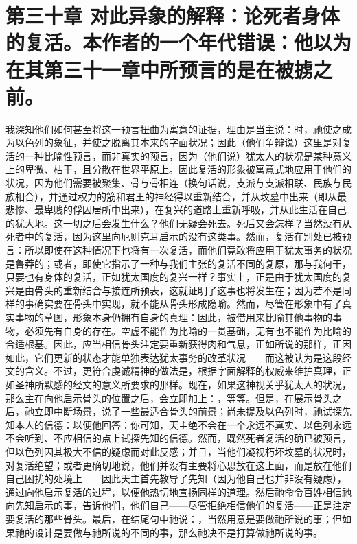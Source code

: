
\section{第三十章 对此异象的解释：论死者身体的复活。\newline{}本作者的一个年代错误：他以为在其第三十一章中所预言的是在被掳之前。}

我深知他们如何甚至将这一预言扭曲为寓意的证据，理由是当主说：时，祂使之成为以色列的象征，并使之脱离其本来的字面状况；因此（他们争辩说）这里是对复活的一种比喻性预言，而非真实的预言，因为（他们说）犹太人的状况是某种意义上的卑微、枯干，且分散在世界平原上。因此复活的形象被寓意式地应用于他们的状况，因为他们需要被聚集、骨与骨相连（换句话说，支派与支派相联、民族与民族相合），并通过权力的筋和君王的神经得以重新结合，并从坟墓中出来（即从最悲惨、最卑贱的俘囚居所中出来），在复兴的道路上重新呼吸，并从此生活在自己的犹大地。这一切之后会发生什么？他们无疑会死去。死后又会怎样？当然没有从死者中的复活，因为这里向厄则克耳启示的没有这类事。然而，复活在别处已被预言：所以即使在这种情况下也将有一次复活，而他们竟敢将应用于犹太事务的状况是鲁莽的；或者，即使它指示了一种与我们主张的复活不同的复原，那与我何干，只要也有身体的复活，正如犹太国度的复兴一样？事实上，正是由于犹太国度的复兴是由骨头的重新结合与接连所预表，这就证明了这事也将发生在；因为若不是同样的事确实要在骨头中实现，就不能从骨头形成隐喻。然而，尽管在形象中有了真实事物的草图，形象本身仍拥有自身的真理：因此，被借用来比喻其他事物的事物，必须先有自身的存在。空虚不能作为比喻的一贯基础，无有也不能作为比喻的合适根基。因此，应当相信骨头注定要重新获得肉和气息，正如所说的那样，正因如此，它们更新的状态才能单独表达犹太事务的改革状况——而这被认为是这段经文的含义。不过，更符合虔诚精神的做法是，根据字面解释的权威来维护真理，正如圣神所默感的经文的意义所要求的那样。现在，如果这神视关乎犹太人的状况，那么主在向他启示骨头的位置之后，会立即加上：，等等。但是，在展示骨头之后，祂立即中断场景，说了一些最适合骨头的前景；尚未提及以色列时，祂试探先知本人的信德：以便他回答：你可知，天主绝不会在一个永远不真实、以色列永远不会听到、不应相信的点上试探先知的信德。然而，既然死者复活的确已被预言，但以色列因其极大不信的疑虑而对此反感；并且，当他们凝视朽坏坟墓的状况时，对复活绝望；或者更确切地说，他们并没有主要将心思放在这上面，而是放在他们自己困扰的处境上——因此天主首先教导了先知（因为他自己也并非没有疑虑），通过向他启示复活的过程，以便他热切地宣扬同样的道理。然后祂命令百姓相信祂向先知启示的事，告诉他们，他们自己——尽管拒绝相信他们的复活——正是注定要复活的那些骨头。最后，在结尾句中祂说：，当然用意是要做祂所说的事；但如果祂的设计是要做与祂所说的不同的事，那么祂决不是打算做祂所说的事。\par

